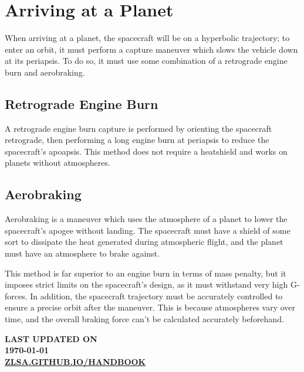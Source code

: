 \documentclass[oneside,a5paper]{book}
\newcommand{\projectlink}{\href{https://zlsa.github.io/handbook/}{\MakeTextUppercase{zlsa.github.io/handbook}}}
\begin{document}
\section{Arriving at a Planet}

When arriving at a planet, the spacecraft will be on a hyperbolic
trajectory; to enter an orbit, it must perform a capture maneuver
which slows the vehicle down at its periapsis. To do so, it must use
some combination of a retrograde engine burn and aerobraking.

\subsection{Retrograde Engine Burn}

A retrograde engine burn capture is performed by orienting the
spacecraft retrograde, then performing a long engine burn at periapsis
to reduce the spacecraft’s apoapsis. This method does not require a
heatshield and works on planets without atmospheres.

\subsection{Aerobraking}

Aerobraking is a maneuver which uses the atmosphere of a planet to
lower the spacecraft’s apogee without landing. The spacecraft must
have a shield of some sort to dissipate the heat generated during
atmospheric flight, and the planet must have an atmosphere to brake
against.

This method is far superior to an engine burn in terms of mass
penalty, but it imposes strict limits on the spacecraft’s design, as
it must withstand very high G-forces. In addition, the spacecraft
trajectory must be accurately controlled to ensure a precise orbit
after the maneuver. This is because atmospheres vary over time, and
the overall braking force can’t be calculated accurately beforehand.

\newpage



\vspace*{\fill}

\begin{centering}
  {\color{light-gray}\large\bf\headingfont\MakeTextUppercase{Last updated on}} \\
  \vspace{1.5em}
  {\color{blue}\huge\bf\headingfont\MakeUppercase\today} \\
  \vspace{1em}
  {\color{light-gray}\bf\monofont\projectlink} \\
  \vspace{3em}
\end{centering}

\vspace*{\fill}
\end{document}
